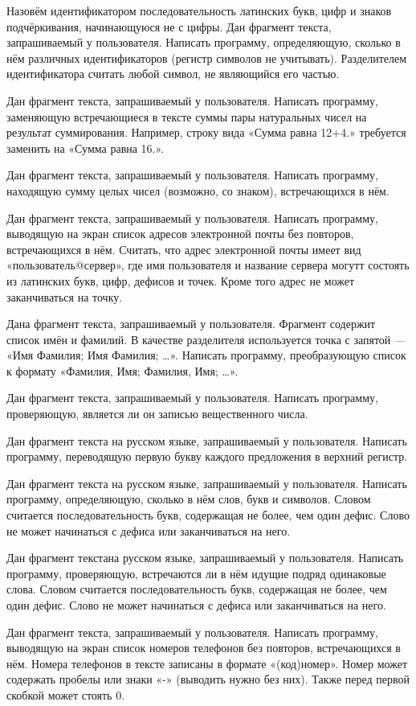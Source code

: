 \task Назовём идентификатором последовательность латинских букв, цифр
и знаков подчёркивания, начинающуюся не с цифры. Дан фрагмент текста,
запрашиваемый у пользователя. Написать программу, определяющую,
сколько в нём различных идентификаторов (регистр символов не
учитывать). Разделителем идентификатора считать любой символ, не
являющийся его частью.

\task Дан фрагмент текста, запрашиваемый у пользователя. Написать
программу, заменяющую встречающиеся в тексте суммы пары натуральных чисел
на результат суммирования. Например, строку вида «Сумма равна 12+4.»
требуется заменить на «Сумма равна 16.».

\task Дан фрагмент текста, запрашиваемый у пользователя. Написать
программу, находящую сумму целых чисел (возможно, со знаком),
встречающихся в нём.

\task Дан фрагмент текста, запрашиваемый у пользователя. Написать
программу, выводящую на экран список адресов электронной почты без
повторов, встречающихся в нём. Считать, что адрес электронной почты
имеет вид «пользователь@сервер», где имя пользователя и название
сервера могутт состоять из латинских букв, цифр, дефисов и точек.
Кроме того адрес не может заканчиваться на точку.

\task Дана фрагмент текста, запрашиваемый у пользователя. Фрагмент
содержит список имён и фамилий. В качестве разделителя используется
точка с запятой — «Имя Фамилия; Имя Фамилия; …». Написать программу,
преобразующую список к формату «Фамилия, Имя; Фамилия, Имя; …».

\task Дан фрагмент текста, запрашиваемый у пользователя. Написать
программу, проверяющую, является ли он записью вещественного числа.

\task Дан фрагмент текста на русском языке, запрашиваемый у
пользователя. Написать программу, переводящую первую букву каждого
предложения в верхний регистр.

\task Дан фрагмент текста на русском языке, запрашиваемый у пользователя.
Написать программу, определяющую, сколько в нём слов, букв и символов.
Словом считается последовательность букв, содержащая не более, чем один
дефис. Слово не может начинаться с дефиса или заканчиваться на него.

\task Дан фрагмент текстана русском языке, запрашиваемый у пользователя.
Написать программу, проверяющую, встречаются ли в нём идущие подряд
одинаковые слова. Словом считается последовательность букв, содержащая
не более, чем один дефис. Слово не может начинаться с дефиса или
заканчиваться на него.

\task Дан фрагмент текста, запрашиваемый у пользователя. Написать
программу, выводящую на экран список номеров телефонов без повторов,
встречающихся в нём. Номера телефонов в тексте записаны в формате
«(код)номер». Номер может содержать пробелы или знаки «-» (выводить нужно
без них). Также перед первой скобкой может стоять 0.
